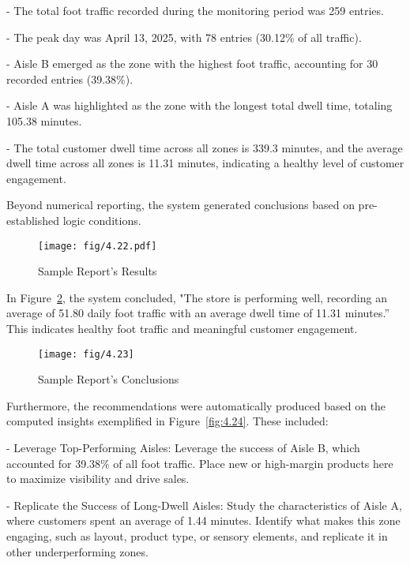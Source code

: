 {\noindent - The total foot traffic recorded during the monitoring period was 259 entries.

\noindent - The peak day was April 13, 2025, with 78 entries (30.12\% of all traffic).

\noindent - Aisle B emerged as the zone with the highest foot traffic, accounting for 30 recorded entries (39.38\%).

\noindent - Aisle A was highlighted as the zone with the longest total dwell time, totaling 105.38 minutes.

\noindent - The total customer dwell time across all zones is 339.3 minutes, and the average dwell time across all zones is 11.31 minutes, indicating a healthy level of customer engagement.

Beyond numerical reporting, the system generated conclusions based on pre-established logic conditions.

\begin{figure}[H]
	\caption[Sample Report’s Results]{\newline \newline Sample Report’s Results}
	\centering
	\texttt{[image: fig/4.22.pdf]}
	\label{fig:4.22}
\end{figure}

In Figure~\ref{fig:4.23}, the system concluded, "The store is performing well, recording an average of 51.80 daily foot traffic with an average dwell time of 11.31 minutes.” This indicates healthy foot traffic and meaningful customer engagement.

\begin{figure}[H]
	\caption[Sample Report’s Conclusions]{\newline \newline Sample Report’s Conclusions}
	\centering
	\texttt{[image: fig/4.23]}
	\label{fig:4.23}
\end{figure}

Furthermore, the recommendations were automatically produced based on the computed insights exemplified in Figure~\ref{fig:4.24}. These included:

\noindent - Leverage Top-Performing Aisles: Leverage the success of Aisle B, which accounted for 39.38\% of all foot traffic. Place new or high-margin products here to maximize visibility and drive sales.

\noindent - Replicate the Success of Long-Dwell Aisles: Study the characteristics of Aisle A, where customers spent an average of 1.44 minutes. Identify what makes this zone engaging, such as layout, product type, or sensory elements, and replicate it in other underperforming zones.

}
